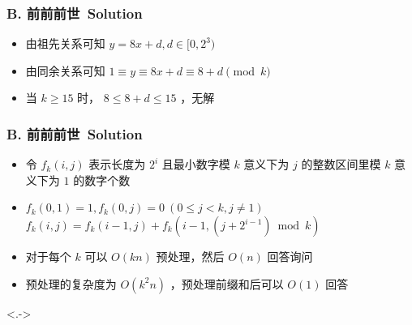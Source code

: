 \documentclass[notheorems]{beamer}
\newcommand{\zhProbB}{前前前世}		\newcommand{\AuthProbB}{\textbf{\underline{\href{http://codeforces.com/profile/EZ_fwtt08}{ez\_fwtt08}}}}
\begin{document}
\begin{frame}
\frametitle{B. \zhProbB\ Solution}
\begin{spacing}{2.0} \large
\begin{itemize}[<+->]
\item 由祖先关系可知 $y = 8 x + d, d \in [0, 2^3)$
\item 由同余关系可知 $1 \equiv y \equiv 8 x + d \equiv 8 + d \pmod{k}$
\item 当 $k \geq 15$ 时， $8 \leq 8 + d \leq 15$ ，\alert{无解}
\end{itemize}
\end{spacing}
\end{frame}
\begin{frame}
\frametitle{B. \zhProbB\ Solution}
\begin{spacing}{2.0} \large
\begin{itemize}[<+->]
\item 令 $f_k(i, j)$ 表示长度为 $2^i$ 且最小数字模 $k$ 意义下为 $j$ 的\alert{整数区间}里模 $k$ 意义下为 $1$ 的数字个数
\item $f_k(0, 1) = 1, f_k(0, j) = 0\ (0 \leq j < k, j \neq 1)$
\\ $f_k(i, j) = f_k(i - 1, j) + f_k(i - 1, (j + 2^{i - 1}) \bmod k)$
\item 对于每个 $k$ 可以 $O(k n)$ 预处理，然后 $O(n)$ 回答询问
\item 预处理的复杂度为 $O(k^2 n)$ ，预处理前缀和后可以 $O(1)$ 回答
\end{itemize}
\end{spacing}
\visible<.->{\hyperlink{Overview}{}}
\end{frame}
\end{document}
